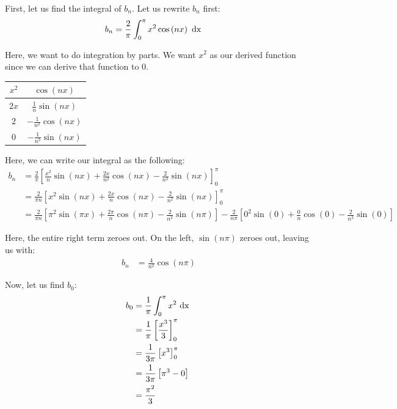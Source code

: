 \documentclass{article}
\begin{document}
\begin{enumerate}
\begin{enumerate}
    First, let us find the integral of $b_n$. Let us rewrite $b_n$ first:
    \begin{align}
      b_n & = \frac{2}{\pi} \int^\pi_0 x^2 \cos\left( n x \right) \text{ dx }
    \end{align}

    Here, we want to do integration by parts. We want $x^2$ as our derived function since we can derive that function to $0$.

    \begin{center}
      \begin{tabular}{c|c}
        $x^2$ & $\displaystyle \cos(n x)$\\
        \hline
        $2x$ & $\displaystyle \frac{1}{n} \sin(n x)$\\
        \hline
        $2$ & $\displaystyle -\frac{1}{n^2} \cos(n x)$\\
        \hline
        $0$ & $\displaystyle -\frac{1}{n^3} \sin(n x)$
      \end{tabular}
    \end{center}

    Here, we can write our integral as the following:
    \begin{align}
      b_n & = \frac{2}{\pi} \left[ \frac{x^2}{n} \sin(n x) + \frac{2x}{n^2} \cos(n x) - \frac{2}{n^3} \sin(n x) \right]^\pi_0\\
      & = \frac{2}{\pi n} \left[ x^2 \sin(n x) + \frac{2x}{n} \cos(n x) - \frac{2}{n^2} \sin(n x) \right]^\pi_0\\
      & = \frac{2}{\pi n} \left[ \pi^2 \sin(\pi x) + \frac{2\pi}{n} \cos(n \pi) - \frac{2}{n^2} \sin(n \pi) \right] - \frac{2}{n \pi} \left[ 0^2 \sin(0) + \frac{0}{n} \cos(0) - \frac{2}{n^2} \sin(0) \right]
    \end{align}

    Here, the entire right term zeroes out. On the left, $\sin(n \pi)$ zeroes out, leaving us with:
    \begin{align}
      b_n & = \frac{4}{n^2} \cos(n \pi)
    \end{align}

    Now, let us find $b_0$:
    \begin{align}
      b_0 & = \frac{1}{\pi} \int^\pi_0 x^2 \text{ dx }\\
      & = \frac{1}{\pi} \left[ \frac{x^3}{3} \right]^\pi_0\\
      & = \frac{1}{3\pi} \left[ x^3 \right]^\pi_0\\
      & = \frac{1}{3\pi} \left[ \pi^3 - 0 \right]\\
      & = \frac{\pi^2}{3}
    \end{align}


\end{enumerate}
\end{enumerate}
\end{document}
